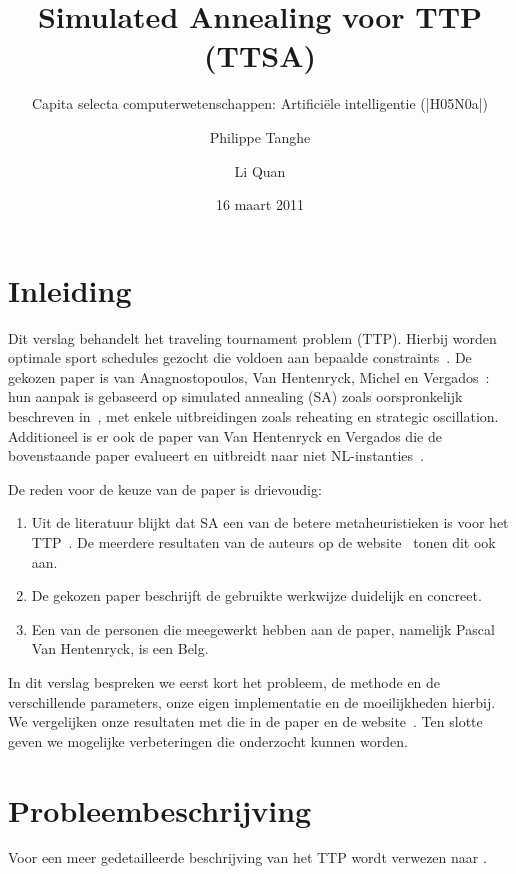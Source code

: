 \documentclass[a4paper,dutch,11pt,]{scrartcl}
\title{Simulated Annealing voor TTP (TTSA)}
\subtitle{Capita selecta computerwetenschappen: Artificiële intelligentie (|H05N0a|)}
\author{Philippe Tanghe \and Li Quan}
\date{16 maart 2011}
\begin{document}
\maketitle



\tableofcontents

\section{Inleiding}
Dit verslag behandelt het traveling tournament problem (TTP). Hierbij worden optimale sport schedules gezocht die voldoen aan bepaalde constraints~\cite{ttp}.
De gekozen paper is van Anagnostopoulos, Van Hentenryck, Michel en Vergados~\cite{paper}: hun aanpak is gebaseerd op simulated annealing (SA) zoals oorspronkelijk beschreven in~\cite{simulatedannealing}, met enkele uitbreidingen zoals reheating en strategic oscillation. Additioneel is er ook de paper van Van Hentenryck en Vergados die de bovenstaande paper evalueert en uitbreidt naar niet NL-instanties~\cite{paper2}.

De reden voor de keuze van de paper is drievoudig:
\begin{enumerate}
 \item Uit de literatuur blijkt dat SA een van de betere metaheuristieken is voor het TTP~\cite{heuristicApproach}. De meerdere resultaten van de auteurs op de website~\cite{website} tonen dit ook aan.
 \item De gekozen paper beschrijft de gebruikte werkwijze duidelijk en concreet.
 \item Een van de personen die meegewerkt hebben aan de paper, namelijk Pascal Van Hentenryck, is een Belg.
\end{enumerate}

In dit verslag bespreken we eerst kort het probleem, de methode en de verschillende parameters, onze eigen implementatie en de moeilijkheden hierbij. We vergelijken onze resultaten met die in de paper en de website~\cite{website}. Ten slotte geven we mogelijke verbeteringen die onderzocht kunnen worden.

\section{Probleembeschrijving}
Voor een meer gedetailleerde beschrijving van het TTP wordt verwezen naar \cite{paper,ttp}.
\end{document}
